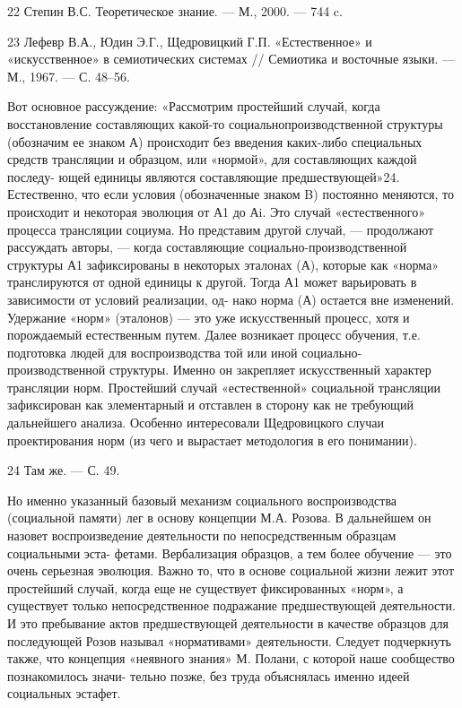 \documentclass[11pt,a4paper]{article}
\begin{document}
22 Степин В.С. Теоретическое знание. — М., 2000. — 744 c.

23 Лефевр В.А., Юдин Э.Г., Щедровицкий Г.П. «Естественное» и «искусственное»
в семиотических системах // Семиотика и восточные языки.  — М., 1967. —
С. 48–56.

Вот основное рассуждение: «Рассмотрим простейший случай, когда
восстановление составляющих какой-то социальнопроизводственной структуры
(обозначим ее знаком А) происходит без введения каких-либо специальных
средств трансляции и образцом, или «нормой», для составляющих каждой последу-
ющей единицы являются составляющие предшествующей»24.  Естественно, что если
условия (обозначенные знаком B) постоянно меняются, то происходит и
некоторая эволюция от А1 до Аi. Это случай «естественного» процесса трансляции
социума.  Но представим другой случай, — продолжают рассуждать авторы, —
когда составляющие социально-производственной структуры А1 зафиксированы в
некоторых эталонах (А), которые как «норма» транслируются от одной единицы к
другой. Тогда А1 может варьировать в зависимости от условий реализации, од-
нако норма (А) остается вне изменений. Удержание «норм» (эталонов) — это уже
искусственный процесс, хотя и порождаемый естественным путем. Далее возникает
процесс обучения, т.е.  подготовка людей для воспроизводства той или иной
социально-производственной структуры. Именно он закрепляет искусственный
характер трансляции норм. Простейший случай «естественной» социальной
трансляции зафиксирован как элементарный и отставлен в сторону как не
требующий дальнейшего анализа. Особенно интересовали Щедровицкого случаи
проектирования норм (из чего и вырастает методология в его понимании).

24 Там же. — С. 49.

Но именно указанный базовый механизм социального воспроизводства (социальной
памяти) лег в основу концепции М.А. Розова. В дальнейшем он назовет
воспроизведение деятельности по непосредственным образцам социальными эста-
фетами. Вербализация образцов, а тем более обучение — это очень серьезная
эволюция. Важно то, что в основе социальной жизни лежит этот простейший
случай, когда еще не существует фиксированных «норм», а существует только
непосредственное подражание предшествующей деятельности. И это пребывание
актов предшествующей деятельности в качестве образцов для последующей Розов
называл «нормативами» деятельности.  Следует подчеркнуть также, что концепция
«неявного знания» М. Полани, с которой наше сообщество познакомилось значи-
тельно позже, без труда объяснялась именно идеей социальных эстафет.
\end{document}
